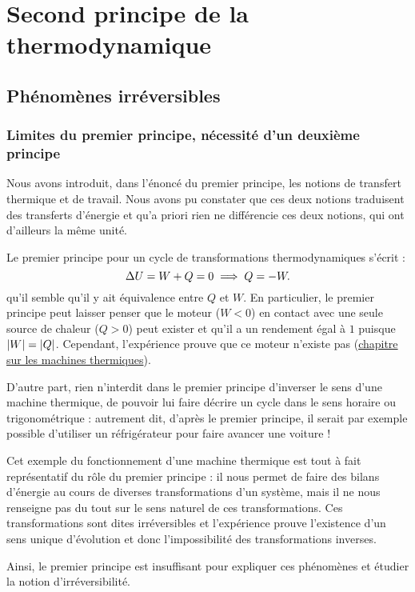 \chapter{Second principe de la thermodynamique}

\minitoc

\section{Phénomènes irréversibles}

\subsection{Limites du premier principe, nécessité d'un deuxième principe}

Nous avons introduit, dans l'énoncé du premier principe, les notions de transfert thermique et de travail. Nous avons pu constater que ces deux notions traduisent des transferts d'énergie et qu'a priori rien ne différencie ces deux notions, qui ont d'ailleurs la même unité.

Le premier principe pour un cycle de transformations thermodynamiques s'écrit : \[\adif{U}=W+Q=0\imp Q=-W.\] \Cad qu'il semble qu'il y ait équivalence entre \(Q\) et \(W\). En particulier, le premier principe peut laisser penser que le moteur (\(W<0\)) en contact avec une seule source de chaleur (\(Q>0\)) peut exister et qu'il a un rendement égal à \(1\) puisque \(\left\lvert W\right\rvert=\left\lvert Q\right\rvert\). Cependant, l'expérience prouve que ce moteur n'existe pas (\cf \hyperref[chap:machinesThermiques]{chapitre sur les machines thermiques}).

D'autre part, rien n'interdit dans le premier principe d'inverser le sens d'une machine thermique, \cad de pouvoir lui faire décrire un cycle dans le sens horaire ou trigonométrique : autrement dit, d'après le premier principe, il serait par exemple possible d'utiliser un réfrigérateur pour faire avancer une voiture !

Cet exemple du fonctionnement d'une machine thermique est tout à fait représentatif du rôle du premier principe : il nous permet de faire des bilans d'énergie au cours de diverses transformations d'un système, mais il ne nous renseigne pas du tout sur le sens naturel de ces transformations. Ces transformations sont dites irréversibles et l'expérience prouve l'existence d'un sens unique d'évolution et donc l'impossibilité des transformations inverses.

Ainsi, le premier principe est insuffisant pour expliquer ces phénomènes et étudier la notion d'irréversibilité.

